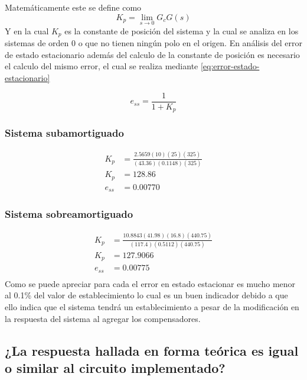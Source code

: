 \documentclass[conference]{IEEEtran}
\begin{document}
	 Matemáticamente este se define como 
	 \begin{equation}
	 	K_p = \lim_{s \to 0} G_c G(s)
	 	\label{eq:error-estado-estacionario-limite}
	 \end{equation}
	 Y en la cual $K_p$ es la constante de posición del sistema y la cual se analiza en los sistemas de orden 0 o que no tienen ningún polo en el origen.
	 En análisis del error de estado estacionario además del calculo de la constante de posición es necesario el calculo del mismo error, el cual se realiza mediante \ref{eq:error-estado-estacionario}
	 
	 \begin{equation}
	 	e_{ss} = \frac{1}{1 + K_p}
	 	\label{eq:error-estado-estacionario}
	 \end{equation}
	 
	 \subsubsection{\textbf{Sistema subamortiguado}}
	 \begin{align}
	 	K_p &= \frac{2.5659(10)(25)(325)}{(43.36)(0.1148)(325)} \\
	 	K_p &= 128.86 \\
	 	e_{ss} &= 0.00770
	 \end{align}
	 
	 \subsubsection{\textbf{Sistema sobreamortiguado}}
	 \begin{align}
	 	K_p &= \frac{10.8843(41.98)(16.8)(440.75)}{(117.4)(0.5112)(440.75)} \\
	 	K_p &= 127.9066 \\
	 	e_{ss} &= 0.00775 \\
	 \end{align}
	 Como se puede apreciar para cada el error en estado estacionar es mucho menor al 0.1\% del valor de establecimiento lo cual es un buen indicador debido a que ello indica que el sistema tendrá un establecimiento a pesar de la modificación en la respuesta del sistema al agregar los compensadores.
	 
	 \subsection{\textbf{¿La respuesta hallada en forma teórica es igual o similar al circuito implementado?}}
	 
\end{document}
